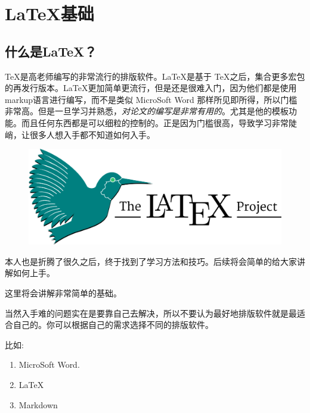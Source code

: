 \documentclass[UTF8,AutoFakeBold]{ctexart}
\numberwithin{figure}{section}
\numberwithin{table}{section}
\begin{document}
\section{\LaTeX 基础}
\label{sec:knowledge}

\subsection{什么是\LaTeX？}
\TeX 是高老师编写的非常流行的排版软件。\LaTeX 是基于 \TeX 之后，集合更多宏包的再发行版本。\LaTeX 更加简单更流行，但是还是很难入门，因为他们都是使用markup语言进行编写，而不是类似 MicroSoft Word 那样所见即所得，所以门槛非常高。但是一旦学习并熟悉，\emph{对论文的编写是非常有用的}。尤其是他的模板功能。而且任何东西都是可以细粒的控制的。正是因为门槛很高，导致学习非常陡峭，让很多人想入手都不知道如何入手。

\begin{figure}[htbp]
    \centering
    \includegraphics[center, scale=0.25]{images/1200px_LaTeX_project_logo_bird.svg.png}
\end{figure}

本人也是折腾了很久之后，终于找到了学习方法和技巧。后续将会简单的给大家讲解如何上手。

这里将会讲解非常简单的基础。

当然入手难的问题实在是要靠自己去解决，所以不要认为最好地排版软件就是最适合自己的。你可以根据自己的需求选择不同的排版软件。

比如:
\begin{enumerate}
    \item MicroSoft Word.
    \item \LaTeX
    \item Markdown
\end{enumerate}
\end{document}
